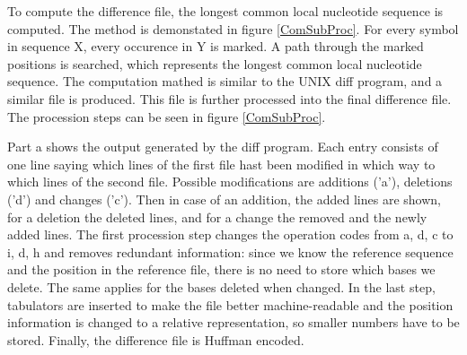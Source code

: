 \documentclass[acmtocl,acmnow]{article}
\begin{document}
To compute the difference file, the longest common local nucleotide sequence is computed. The method is demonstated in
figure \ref{ComSubProc}. For every symbol in sequence X, every occurence in Y is marked. A path through the marked positions
is searched, which represents the longest common local nucleotide sequence.
The computation mathed is similar to the UNIX diff program, and a similar file is produced. This file is further processed
into the final difference file. The procession steps can be seen in figure \ref{ComSubProc}.

Part a shows the output generated by the diff program. Each entry consists of one line saying which lines of the first file
hast been modified in which way to which lines of the second file. Possible modifications are additions ('a'), deletions
('d') and changes ('c'). Then in case of an addition, the added lines are shown, for a deletion the deleted lines, and 
for a change the removed and the newly added lines. The first procession step changes the operation codes from a, d, c to
i, d, h and removes redundant information: since we know the reference sequence and the position in the reference file,
there is no need to store which bases we delete. The same applies for the bases deleted when changed.
In the last step, tabulators are inserted to make the file better machine-readable and the position information is
changed to a relative representation, so smaller numbers have to be stored.
Finally, the difference file is Huffman encoded.
\end{document}
